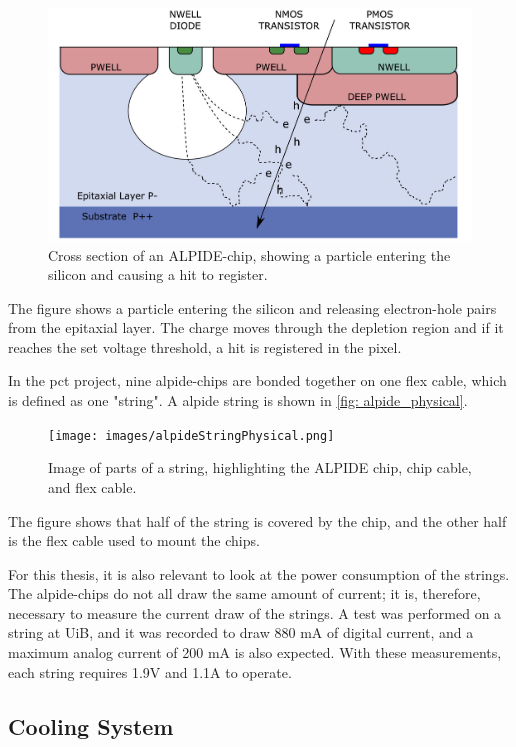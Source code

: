 \documentclass[main.tex]{subfiles}
\begin{document}
\begin{figure}[!htpb]
    \centering
    \includegraphics[width=12cm]{images/alpide_chip.jpg}
    \caption{Cross section of an ALPIDE-chip, showing a particle entering the silicon and causing a hit to register.}
    \label{fig: alpide_cross}
\end{figure}
\FloatBarrier


The figure shows a particle entering the silicon and releasing electron-hole pairs from the epitaxial layer. The charge moves through the depletion region and if it reaches the set voltage threshold, a hit is registered in the pixel.

In the \gls{pct} project, nine \gls{alpide}-chips are bonded together on one flex cable, which is defined as one "string". A \gls{alpide} string is shown in \autoref{fig: alpide_physical}.

\begin{figure}[!htpb]
    \centering
    \texttt{[image: images/alpideStringPhysical.png]}
    \caption{Image of parts of a string, highlighting the ALPIDE chip, chip cable, and flex cable.}
    \label{fig: alpide_physical}
\end{figure}
\FloatBarrier

The figure shows that half of the string is covered by the chip, and the other half is the flex cable used to mount the chips.

For this thesis, it is also relevant to look at the power consumption of the strings. The \gls{alpide}-chips do not all draw the same amount of current; it is, therefore, necessary to measure the current draw of the strings. A test was performed on a string at UiB, and it was recorded to draw 880 mA of digital current, and a maximum analog current of 200 mA is also expected. With these measurements, each string requires 1.9V and 1.1A to operate. 


\subsection{Cooling System}
\end{document}
